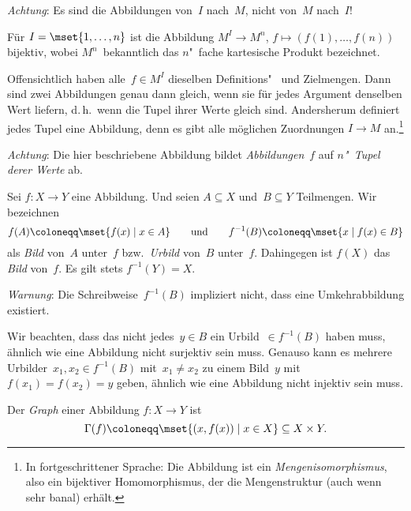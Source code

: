 \documentclass[a4paper]{article}
\begin{document}
\emph{Achtung}: Es sind die Abbildungen von~$I$ nach~$M$, nicht von~$M$ nach~$I$!

\begin{example}\label{ex:map:setisoproduct}
    Für $I = \mset{1, \dots, n}$ ist die Abbildung $M^I \to M^n$, $f \mapsto (f(1), \dots, f(n))$ bijektiv, wobei $M^n$~bekanntlich das $n$"~fache kartesische Produkt bezeichnet.

    Offensichtlich haben alle~$f \in M^I$ dieselben Definitions"~ und Zielmengen. Dann sind zwei Abbildungen genau dann gleich, wenn sie für jedes Argument denselben Wert liefern, d.\,h.\ wenn die Tupel ihrer Werte gleich sind. Andersherum definiert jedes Tupel eine Abbildung, denn es gibt alle möglichen Zuordnungen $I \to M$ an.\footnote{In fortgeschrittener Sprache: Die Abbildung ist ein \emph{Mengenisomorphismus}, also ein bijektiver Homomorphismus, der die Mengenstruktur (auch wenn sehr banal) erhält.}

    \emph{Achtung}: Die hier beschriebene Abbildung bildet \emph{Abbildungen}~$f$ auf \emph{$n$"~Tupel derer Werte} ab.
\end{example}

\begin{definition}
    Sei $f\colon X \to Y$ eine Abbildung. Und seien $A \subseteq X$ und~$B \subseteq Y$ Teilmengen. Wir bezeichnen
    \begin{equation*}
        f(A) \coloneqq \mset{f(x) \mid x \in A} \qquad\text{und}\qquad f^{-1}(B) \coloneqq \mset{x \mid f(x) \in B}
    \end{equation*}
    als \emph{Bild} von~$A$ unter~$f$ bzw.\ \emph{Urbild} von~$B$ unter~$f$. Dahingegen ist $f(X)$ das \emph{Bild} von~$f$. Es gilt stets $f^{-1}(Y) = X$.
\end{definition}

\emph{Warnung}: Die Schreibweise~$f^{-1}(B)$ impliziert nicht, dass eine Umkehrabbildung existiert.

\begin{remark}
    Wir beachten, dass das nicht jedes~$y \in B$ ein Urbild~$\in f^{-1}(B)$ haben muss, ähnlich wie eine Abbildung nicht surjektiv sein muss. Genauso kann es mehrere Urbilder~$x_1,x_2 \in f^{-1}(B)$ mit~$x_1 \neq x_2$ zu einem Bild~$y$ mit $f(x_1) = f(x_2) = y$ geben, ähnlich wie eine Abbildung nicht injektiv sein muss.
\end{remark}

\begin{definition}[Graph]
    Der \emph{Graph} einer Abbildung $f\colon X \to Y$ ist
    \begin{equation*}
        \Gamma(f) \coloneqq \mset{(x, f(x)) \mid x \in X} \subseteq X \times Y.
    \end{equation*}
\end{definition}
\end{document}
